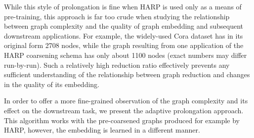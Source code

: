 While this style of prolongation is fine when HARP is used only as a means of pre-training, this approach is far too crude when studying the relationship between graph complexity and the quality of graph embedding and subsequent downstream applications. For example, the widely-used Cora dataset \cite{yang_revisiting_2016} has in its original form 2708 nodes, while the graph resulting from one application of the HARP coarsening schema has only about 1100 nodes (exact numbers may differ run-by-run). Such a relatively high reduction ratio effectively prevents any sufficient understanding of the relationship between graph reduction and changes in the quality of its embedding.

In order to offer a more fine-grained observation of the graph complexity and its effect on the downstream task, we present the adaptive prolongation approach. This algorithm works with the pre-coarsened graphs produced for example by HARP, however, the embedding is learned in a different manner.

